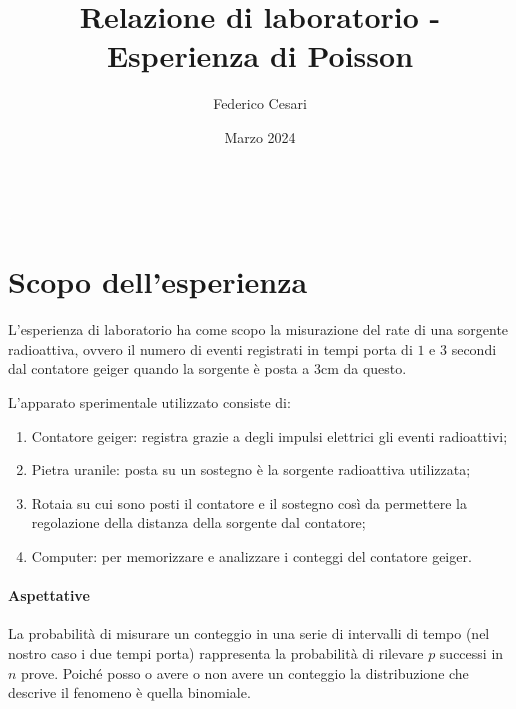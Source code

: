 \documentclass{article}
\title{Relazione di laboratorio - Esperienza di Poisson}
\author{Federico Cesari}
\date{Marzo 2024}
\begin{document}





\textcolor{white}{.}
\vfill
\section{Scopo dell'esperienza}
L'esperienza di laboratorio ha come scopo la misurazione del rate di una sorgente radioattiva, ovvero il numero di eventi registrati in tempi porta di $1$ e $3$ secondi dal contatore geiger quando la sorgente è posta a \(3\)cm da questo. 

L'apparato sperimentale utilizzato consiste di: 

\begin{enumerate}
	\item Contatore geiger: registra grazie a degli impulsi elettrici gli eventi radioattivi;
	\item Pietra uranile: posta su un sostegno è la sorgente radioattiva utilizzata;
	\item Rotaia su cui sono posti il contatore e il sostegno così da permettere la regolazione della distanza della sorgente dal contatore;
	\item Computer: per memorizzare e analizzare i conteggi del contatore geiger.
\end{enumerate}

\paragraph{Aspettative}
La probabilità di misurare un conteggio in una serie di intervalli di tempo (nel nostro caso i due tempi porta) rappresenta la probabilità di rilevare $p$ successi in $n$ prove. Poiché posso o avere o non avere un conteggio la distribuzione che descrive il fenomeno è quella binomiale. 
\end{document}

